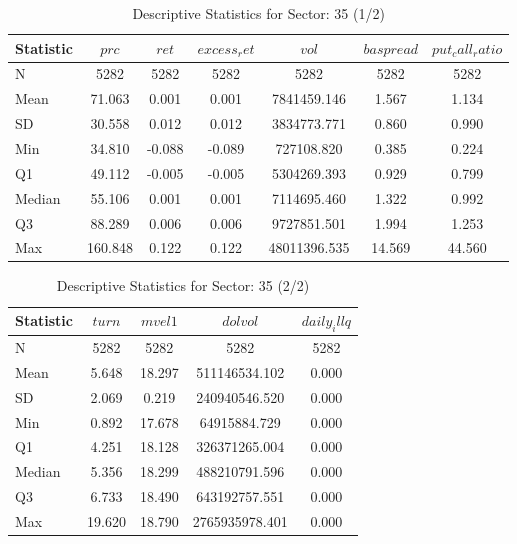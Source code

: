     \begin{table}[ht]
    \centering

    
    \caption{Descriptive Statistics for Sector: 35 (1/2)}
    \label{tab:sec35_a}
    
    \begin{tabular}{lcccccc}
    \toprule
    Statistic & $prc$ & $ret$ & $excess_ret$ & $vol$ & $baspread$ & $put_call_ratio$ \\\midrule
    N & 5282 & 5282 & 5282 & 5282 & 5282 & 5282 \\
    Mean & 71.063 & 0.001 & 0.001 & 7841459.146 & 1.567 & 1.134 \\
    SD & 30.558 & 0.012 & 0.012 & 3834773.771 & 0.860 & 0.990 \\
    Min & 34.810 & -0.088 & -0.089 & 727108.820 & 0.385 & 0.224 \\
    Q1 & 49.112 & -0.005 & -0.005 & 5304269.393 & 0.929 & 0.799 \\
    Median & 55.106 & 0.001 & 0.001 & 7114695.460 & 1.322 & 0.992 \\
    Q3 & 88.289 & 0.006 & 0.006 & 9727851.501 & 1.994 & 1.253 \\
    Max & 160.848 & 0.122 & 0.122 & 48011396.535 & 14.569 & 44.560 \\
    \bottomrule
    \end{tabular}

    \end{table}
    
    \begin{table}[ht]
    \centering

    
    \caption{Descriptive Statistics for Sector: 35 (2/2)}
    \label{tab:sec35_b}
    
    \begin{tabular}{lcccc}
    \toprule
    Statistic & $turn$ & $mvel1$ & $dolvol$ & $daily_illq$ \\\midrule
    N & 5282 & 5282 & 5282 & 5282 \\
    Mean & 5.648 & 18.297 & 511146534.102 & 0.000 \\
    SD & 2.069 & 0.219 & 240940546.520 & 0.000 \\
    Min & 0.892 & 17.678 & 64915884.729 & 0.000 \\
    Q1 & 4.251 & 18.128 & 326371265.004 & 0.000 \\
    Median & 5.356 & 18.299 & 488210791.596 & 0.000 \\
    Q3 & 6.733 & 18.490 & 643192757.551 & 0.000 \\
    Max & 19.620 & 18.790 & 2765935978.401 & 0.000 \\
    \bottomrule
    \end{tabular}

    \end{table}
    
